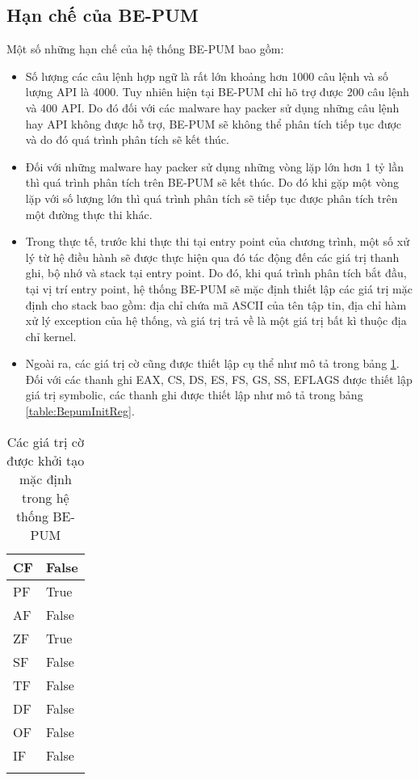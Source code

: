 \subsection{Hạn chế của BE-PUM}

\hspace{0.5cm}Một số những hạn chế của hệ thống BE-PUM bao gồm:

\begin{itemize}
\item{Số lượng các câu lệnh hợp ngữ là rất lớn khoảng hơn 1000 câu lệnh và số lượng API là 4000. Tuy nhiên hiện tại BE-PUM chỉ hõ trợ được 200 câu lệnh và 400 API. Do đó đối với các malware hay packer sử dụng những câu lệnh hay API không được hỗ trợ, BE-PUM sẽ không thể phân tích tiếp tục được và do đó quá trình phân tích sẽ kết thúc.\\}
\item{Đối với những malware hay packer sử dụng những vòng lặp lớn hơn 1 tỷ lần thì quá trình phân tích trên BE-PUM sẽ kết thúc. Do đó khi gặp một vòng lặp với số lượng lớn thì quá trình phân tích sẽ tiếp tục được phân tích trên một đường thực thi khác.\\}
\item{Trong thực tế, trước khi thực thi tại entry point của chương trình, một số xử lý từ hệ điều hành sẽ được thực hiện qua đó tác động đến các giá trị thanh ghi, bộ nhớ và stack tại entry point. Do đó, khi quá trình phân tích bắt đầu, tại vị trí entry point, hệ thống BE-PUM sẽ mặc định thiết lập các giá trị mặc định cho stack bao gồm: địa chỉ chứa mã ASCII của tên tập tin, địa chỉ hàm xử lý exception của hệ thống, và giá trị trả về là một giá trị bất kì thuộc địa chỉ kernel.\\}
\item{Ngoài ra, các giá trị cờ cũng được thiết lập cụ thể như mô tả trong bảng \ref {table:BepumInitFlag}. Đối với các thanh ghi EAX, CS, DS, ES, FS, GS, SS, EFLAGS được thiết lập giá trị symbolic, các thanh ghi được thiết lập như mô tả trong bảng \ref {table:BepumInitReg}.
}
\end{itemize}

\begin{longtable}{ | m{2cm} | m{5cm} | }
\hline 
CF & False\\
\hline 
PF & True\\
\hline 
AF & False\\
\hline 
ZF & True\\
\hline 
SF & False\\
\hline 
TF & False\\
\hline 
DF & False\\
\hline 
OF & False\\
\hline 
IF & False\\
\hline
\caption{Các giá trị cờ được khởi tạo mặc định trong hệ thống BE-PUM}
\label{table:BepumInitFlag}
\end{longtable}

